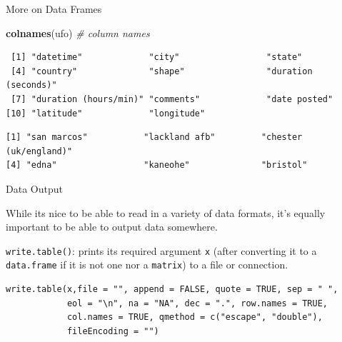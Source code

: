 \documentclass[
  ignorenonframetext,
]{beamer}
\newenvironment{Shaded}{\begin{snugshade}}{\end{snugshade}}
\newcommand{\CommentTok}[1]{\textcolor[rgb]{0.56,0.35,0.01}{\textit{#1}}}
\newcommand{\KeywordTok}[1]{\textcolor[rgb]{0.13,0.29,0.53}{\textbf{#1}}}
\newcommand{\NormalTok}[1]{#1}
\newcommand{\OperatorTok}[1]{\textcolor[rgb]{0.81,0.36,0.00}{\textbf{#1}}}
\begin{document}
\begin{frame}[fragile]{More on Data Frames}
\protect\hypertarget{more-on-data-frames}{}

\begin{Shaded}
\begin{Highlighting}[]
\KeywordTok{colnames}\NormalTok{(ufo) }\CommentTok{# column names}
\end{Highlighting}
\end{Shaded}

\begin{verbatim}
 [1] "datetime"             "city"                 "state"               
 [4] "country"              "shape"                "duration (seconds)"  
 [7] "duration (hours/min)" "comments"             "date posted"         
[10] "latitude"             "longitude"           
\end{verbatim}

\begin{Shaded}
\end{Shaded}

\begin{verbatim}
[1] "san marcos"           "lackland afb"         "chester (uk/england)"
[4] "edna"                 "kaneohe"              "bristol"             
\end{verbatim}

\end{frame}

\begin{frame}[fragile]{Data Output}
\protect\hypertarget{data-output}{}

While its nice to be able to read in a variety of data formats, it's
equally important to be able to output data somewhere.

\texttt{write.table()}: prints its required argument \texttt{x} (after
converting it to a \texttt{data.frame} if it is not one nor a
\texttt{matrix}) to a file or connection.

\begin{verbatim}
write.table(x,file = "", append = FALSE, quote = TRUE, sep = " ",
            eol = "\n", na = "NA", dec = ".", row.names = TRUE,
            col.names = TRUE, qmethod = c("escape", "double"),
            fileEncoding = "")
\end{verbatim}

\end{frame}
\end{document}
